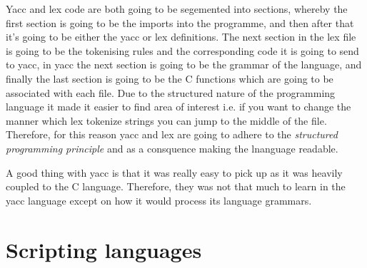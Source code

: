 \documentclass[
	12pt, %
]{fphw}
\begin{document}
Yacc and lex code are both going to be segemented into sections, whereby the
first section is going to be the imports into the programme, and then after that 
it's going to be either the yacc or lex definitions. The next section in the lex
file is going to be the tokenising rules and the corresponding code it is going
to send to yacc, in yacc the next section is going to be the grammar of the 
language, and finally the last section is going to be the C functions which are
going to be associated with each file. Due to the structured nature of the 
programming language it made it easier to find area of interest i.e. if you want
to change the manner which lex tokenize strings you can jump to the middle of the 
file. Therefore, for this reason yacc and lex are going to adhere to the 
\emph{structured programming principle} and as a consquence making the lnanguage
readable.\par

A good thing with yacc is that it was really easy to pick up as it was heavily 
coupled to the C language. Therefore, they was not that much to learn in the
yacc language except on how it would process its language grammars. \par

\section{Scripting languages}
\end{document}
